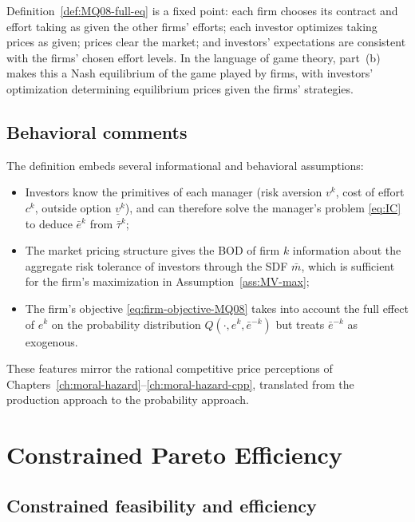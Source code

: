\documentclass[11pt,a4paper,oneside]{book}
\theoremstyle{plain}
\theoremstyle{definition}
\theoremstyle{remark}
\numberwithin{equation}{chapter}
\begin{document}
Definition~\ref{def:MQ08-full-eq} is a fixed point: each firm chooses its contract and effort taking as given the other firms' efforts; each investor optimizes taking prices as given; prices clear the market; and investors' expectations are consistent with the firms' chosen effort levels.
In the language of game theory, part~(b) makes this a Nash equilibrium of the game played by firms, with investors' optimization determining equilibrium prices given the firms' strategies.

\subsection{Behavioral comments}

The definition embeds several informational and behavioral assumptions:
\begin{itemize}
  \item Investors know the primitives of each manager (risk aversion $v^k$, cost of effort $c^k$, outside option $\underline{v}^k$), and can therefore solve the manager's problem \eqref{eq:IC} to deduce $\bar{e}^k$ from $\bar{\tau}^k$;
  \item The market pricing structure gives the BOD of firm $k$ information about the aggregate risk tolerance of investors through the SDF $\bar{m}$, which is sufficient for the firm's maximization in Assumption~\ref{ass:MV-max};
  \item The firm's objective \eqref{eq:firm-objective-MQ08} takes into account the full effect of $e^k$ on the probability distribution $Q(\cdot, e^k, \bar{e}^{-k})$ but treats $\bar{e}^{-k}$ as exogenous.
\end{itemize}
These features mirror the rational competitive price perceptions of Chapters~\ref{ch:moral-hazard}--\ref{ch:moral-hazard-cpp}, translated from the production approach to the probability approach.

\section{Constrained Pareto Efficiency}
\label{sec:MQ08-CPO}

\subsection{Constrained feasibility and efficiency}
\end{document}
